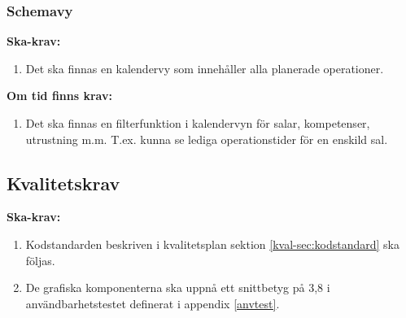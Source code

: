 \documentclass[twoside]{article}
\begin{document}
\subsubsection{Schemavy}
\textbf{Ska-krav: }
\begin{enumerate}[resume]
\item Det ska finnas en kalendervy som innehåller alla planerade operationer.
\end{enumerate}
\textbf{Om tid finns krav:}
\begin{enumerate}[resume]
\item Det ska finnas en filterfunktion i kalendervyn för salar, kompetenser, utrustning m.m. T.ex. kunna se lediga operationstider för en enskild sal.
\end{enumerate}

\subsection{Kvalitetskrav}
\label{subsec:kvalitetsakrav}
\textbf{Ska-krav: }
\begin{enumerate}[resume]
\item Kodstandarden beskriven i kvalitetsplan sektion \ref{kval-sec:kodstandard} ska följas.

\item De grafiska komponenterna ska uppnå ett snittbetyg på 3,8 i användbarhetstestet definerat i appendix \ref{anvtest}.
\end{enumerate}





\appendix

\clearpage

\clearpage

\end{document}
